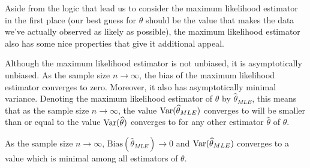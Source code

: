 Aside from the logic that lead us to consider the maximum likelihood estimator in the first place (our best guess for $\theta$ should be the value that makes the data we've actually observed as likely as possible), the maximum likelihood estimator also has some nice properties that give it additional appeal.
\par
Although the maximum likelihood estimator is not unbiased, it is asymptotically unbiased. As the sample size $n \to \infty$, the bias of the maximum likelihood estimator converges to zero. Moreover, it also has asymptotically minimal variance. Denoting the maximum likelihood estimator of $\theta$ by $\widehat{\theta}_{MLE}$, this means that as the sample size $n \to \infty$, the value $\operatorname{Var}(\widehat{\theta}_{MLE})$ converges to will be smaller than or equal to the value $\operatorname{Var}(\widehat{\theta})$ converges to for any other estimator $\widehat{\theta}$ of $\theta$.

\begin{prop} As the sample size $n \to \infty$, $\text{Bias}(\widehat{\theta}_{MLE}) \to 0$ and $\operatorname{Var}(\widehat{\theta}_{MLE})$ converges to a value which is minimal among all estimators of $\theta$.
\end{prop}

